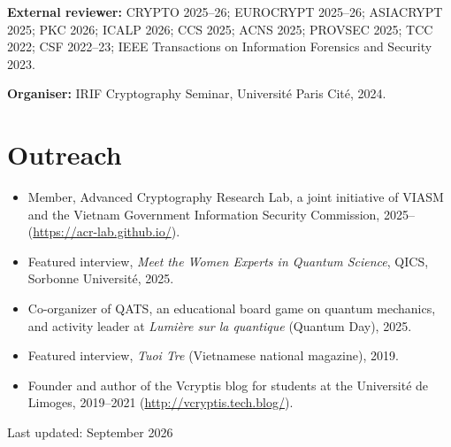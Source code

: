 \documentclass[11pt]{article}
\begin{document}
\smallskip
\textbf{External reviewer:} CRYPTO 2025--26; EUROCRYPT 2025--26; ASIACRYPT 2025; PKC 2026;
ICALP 2026; CCS 2025; ACNS 2025; PROVSEC 2025; TCC 2022; CSF 2022--23;
IEEE Transactions on Information Forensics and Security 2023.

\smallskip
\textbf{Organiser:} IRIF Cryptography Seminar, Universit\'e Paris Cit\'e, 2024.

\section{Outreach}
\begin{itemize}
  \item Member, Advanced Cryptography Research Lab, a joint initiative of VIASM and the
        Vietnam Government Information Security Commission, 2025--
        (\url{https://acr-lab.github.io/}).
  \item Featured interview, \emph{Meet the Women Experts in Quantum Science}, QICS,
        Sorbonne Universit\'e, 2025.
  \item Co-organizer of QATS, an educational board game on quantum mechanics, and activity
        leader at \emph{Lumi\`ere sur la quantique} (Quantum Day), 2025.
  \item Featured interview, \emph{Tuoi Tre} (Vietnamese national magazine), 2019.
  \item Founder and author of the Vcryptis blog for students at the Universit\'e de Limoges,
        2019--2021 (\url{http://vcryptis.tech.blog/}).
\end{itemize}

\vfill
{\small\hfill Last updated: September 2026}
\end{document}
